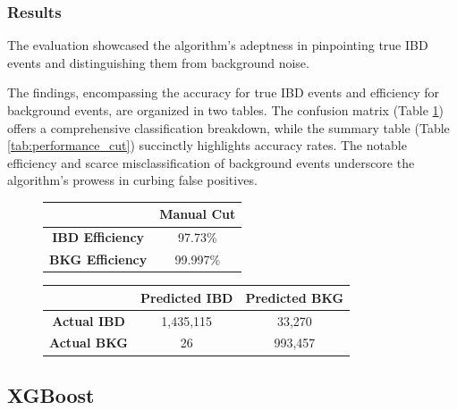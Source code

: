 \subsubsection{Results}
The evaluation showcased the algorithm's adeptness in pinpointing true IBD events and distinguishing them from background noise.

The findings, encompassing the accuracy for true IBD events and efficiency for background events, are organized in two tables. The confusion matrix (Table \ref{tab:confusion_matrix_cut}) offers a comprehensive classification breakdown, while the summary table (Table \ref{tab:performance_cut}) succinctly highlights accuracy rates. The notable efficiency and scarce misclassification of background events underscore the algorithm's prowess in curbing false positives.


\begin{figure}[h!]
	\centering
	\small
	\hspace{-4cm}
	\begin{minipage}{0.3\textwidth}
		\begin{tabular}{cc}
			\toprule
			 & \textbf{Manual Cut} \\ 
			\midrule
			\textbf{IBD Efficiency} &  97.73\% \\ 
			\textbf{BKG Efficiency} &  99.997\% \\ 
			\bottomrule
		\end{tabular}
		\label{tab:performance_cut}
	\end{minipage}
\hspace{1.5cm}
	\begin{minipage}{0.5\textwidth}
		\centering
		\begin{tabular}{ccc}
			\toprule
			& \textbf{Predicted IBD} & \textbf{Predicted BKG} \\
			\midrule
			\textbf{Actual IBD} & 1,435,115 & 33,270 \\
			\textbf{Actual BKG} & 26 & 993,457 \\
			\bottomrule
		\end{tabular}
	\label{tab:confusion_matrix_cut}
	\end{minipage}
	\hspace{-2cm}
\end{figure}

\subsection{XGBoost}

